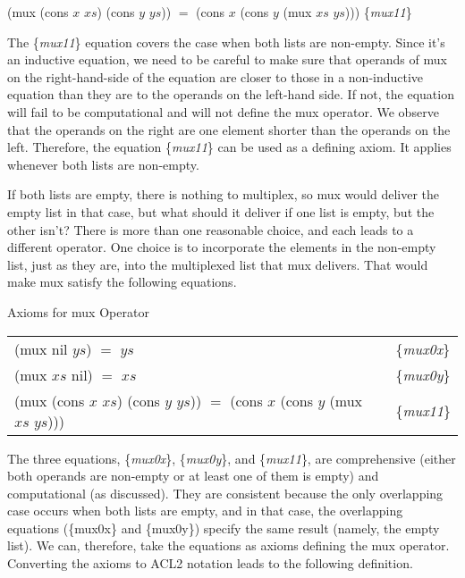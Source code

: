 \hspace{1cm} \textsf{(mux (cons $x$ $xs$) (cons $y$ $ys$)) $=$ (cons $x$ (cons $y$ (mux $xs$ $ys$)))}
\hfill \{\emph{mux11}\}

The \{\emph{mux11}\} equation covers the case when both lists are non-empty.
Since it's an inductive equation, we need to be careful to make sure
that operands of \textsf{mux} on the right-hand-side of the equation
are closer to those in a non-inductive equation than they are
to the operands on the left-hand side.
If not, the equation will fail to be computational and
will not define the \textsf{mux} operator.
We observe that the operands on the right
are one element shorter than the operands on the left.
Therefore, the equation \{\emph{mux11}\} can be used
as a defining axiom. It applies whenever both lists are non-empty.

If both lists are empty, there is nothing to multiplex,
so \textsf{mux} would deliver the empty list in that case, but
what should it deliver if one list is empty, but the other isn't?
There is more than one reasonable choice, and each leads to
a different operator. One choice is to incorporate the elements
in the non-empty list, just as they are, into the
multiplexed list that \textsf{mux}  delivers.
That would make \textsf{mux} satisfy the following equations.

\begin{center}
Axioms for \textsf{mux} Operator\label{axioms:mux}
\begin{tabular}{ll}
\textsf{(mux nil $ys$) $=$ $ys$}  & \{\emph{mux0x}\}     \\
\textsf{(mux $xs$ nil) $=$ $xs$}  & \{\emph{mux0y}\}     \\
\textsf{(mux (cons $x$ $xs$) (cons $y$ $ys$)) $=$ (cons $x$ (cons $y$ (mux $xs$ $ys$)))} & \{\emph{mux11}\} \\
\end{tabular}
\end{center}

\label{def:mux}The three equations, \{\emph{mux0x}\}, \{\emph{mux0y}\}, and \{\emph{mux11}\},
are comprehensive (either both operands are non-empty
or at least one of them is empty) and computational (as discussed).
They are consistent because the only overlapping case
occurs when both lists are empty, and in that case,
the overlapping equations
(\{mux0x\} and \{mux0y\}) specify the same result
(namely, the empty list).
We can, therefore, take the equations as axioms
defining the \textsf{mux} operator.
Converting the axioms to ACL2 notation leads to the following
definition.

